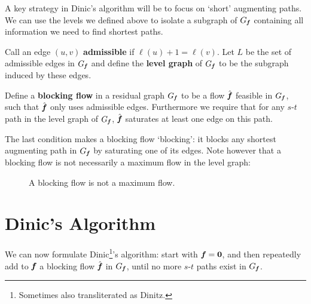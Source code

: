 A key strategy in Dinic's algorithm will be to focus on `short' augmenting paths. We can use the levels we
defined above to isolate a subgraph of $G_{\boldsymbol{\mathit{f}}}$ containing all information we need to find shortest paths.
\begin{definition}
  Call an edge $(u, v)$ \textbf{admissible} if $\ell(u)+1 = \ell(v)$. Let $L$ be the set of
  admissible edges in $G_{\boldsymbol{\mathit{f}}}$ and define the \textbf{level graph} of $G_{\boldsymbol{\mathit{f}}}$ to be the subgraph
  induced by these edges.
\end{definition}

\begin{definition}
  Define a \textbf{blocking flow} in a residual graph $G_{\boldsymbol{\mathit{f}}}$ to be a flow $\hat{\boldsymbol{\mathit{f}}}$ feasible in $G_{\boldsymbol{\mathit{f}}}$,
  such that $\hat{\boldsymbol{\mathit{f}}}$ only uses admissible edges. Furthermore we require that for any $s$-$t$ path in
  the level graph of $G_{\boldsymbol{\mathit{f}}}$, $\hat{\boldsymbol{\mathit{f}}}$ saturates at least one edge on this path.
\end{definition}

The last condition makes a blocking flow `blocking': it blocks any shortest augmenting path in $G_{\boldsymbol{\mathit{f}}}$ by
saturating one of its edges. Note however that a blocking flow is not necessarily a maximum flow in the
level graph:

\begin{figure}
  \centering
  \caption{A blocking flow is not a maximum flow.}
\end{figure}

\section{Dinic's Algorithm}
We can now formulate Dinic\footnote{Sometimes also transliterated as Dinitz.}'s algorithm: start with
$\boldsymbol{\mathit{f}} = \boldsymbol{0}$, and then repeatedly add to $\boldsymbol{\mathit{f}}$ a blocking flow $\hat{\boldsymbol{\mathit{f}}}$ in $G_{\boldsymbol{\mathit{f}}}$, until no more $s$-$t$ paths
exist in $G_{\boldsymbol{\mathit{f}}}$.


